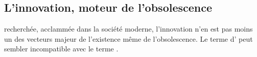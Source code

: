 \subsection{L'innovation, moteur de l'obsolescence}
recherchée, acclammée dans la société moderne, l'innovation n'en est pas moins un des vecteurs majeur de l'existence même de l'obsolescence. Le terme d' peut sembler incompatible avec le terme .
